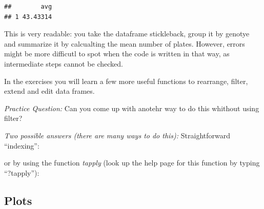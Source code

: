 \documentclass[]{article}
\newenvironment{Shaded}{\begin{snugshade}}{\end{snugshade}}
\newcommand{\KeywordTok}[1]{\textcolor[rgb]{0.13,0.29,0.53}{\textbf{#1}}}
\newcommand{\NormalTok}[1]{#1}
\newcommand{\OperatorTok}[1]{\textcolor[rgb]{0.81,0.36,0.00}{\textbf{#1}}}
\newcommand{\StringTok}[1]{\textcolor[rgb]{0.31,0.60,0.02}{#1}}
\begin{document}
\begin{verbatim}
##        avg
## 1 43.43314
\end{verbatim}

This is very readable: you take the dataframe stickleback, group it by
genotye and summarize it by calcualting the mean number of plates.
However, errors might be more difficutl to spot when the code is written
in that way, as intermediate steps cannot be checked.

In the exercises you will learn a few more useful functions to
rearrange, filter, extend and edit data frames.

\emph{Practice Question:} Can you come up with anotehr way to do this
whithout using filter?

\emph{Two possible answers (there are many ways to do this):}
Straightforward ``indexing'':

\begin{Shaded}
\end{Shaded}

or by using the function \emph{tapply} (look up the help page for this
function by typing ``?tapply''):

\begin{Shaded}
\end{Shaded}

\hypertarget{plots}{%
\subsection{Plots}\label{plots}}
\end{document}
